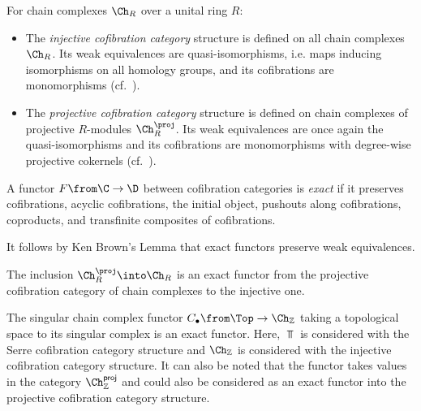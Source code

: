 \begin{example}\label{Ch-cof-cat}
  For chain complexes $\Ch_R$ over a unital ring $R$:
  \begin{itemize}
      \item The \emph{injective cofibration category} structure is defined on all chain complexes $\Ch_R$. Its weak equivalences are quasi-isomorphisms, i.e. maps inducing isomorphisms on all homology groups, and its cofibrations are monomorphisms (cf.~\cite[Thm.~2.3.13]{hovey:book}).
      \item The \emph{projective cofibration category} structure is defined on chain complexes of projective $R$-modules $\Ch_R^\proj$. Its weak equivalences are once again the quasi-isomorphisms and its cofibrations are monomorphisms with degree-wise projective cokernels (cf.~\cite[Thm.~2.3.11]{hovey:book}).
  \end{itemize}
\end{example}

\begin{defi}
  A functor $F \from \C \to \D$ between cofibration categories is \emph{exact} if it preserves cofibrations, acyclic cofibrations, the initial object, pushouts along cofibrations, coproducts, and transfinite composites of cofibrations.
\end{defi}

\begin{remark} \label{rem:ken-brown}
    It follows by Ken Brown's Lemma \cite[Lem.~1.1.12]{hovey:book} that exact functors preserve weak equivalences.
\end{remark}

\begin{example}\label{Ch-inclusion-exact}
  The inclusion $\Ch_R^\proj \into \Ch_R$ is an exact functor from the projective cofibration category of chain complexes to the injective one.
\end{example}

\begin{example}
  The singular chain complex functor $C_\bullet  \from \Top \to \Ch_\mathbb{Z}$ taking a topological space to its singular complex is an exact functor.
  Here, $\Top$ is considered with the Serre cofibration category structure and $\Ch_\mathbb{Z}$ is considered with the injective cofibration category structure.
  It can also be noted that the functor takes values in the category $\Ch_\mathbb{Z}^\mathsf{proj}$ and could also be considered as an exact functor into the projective cofibration category structure.
\end{example}


